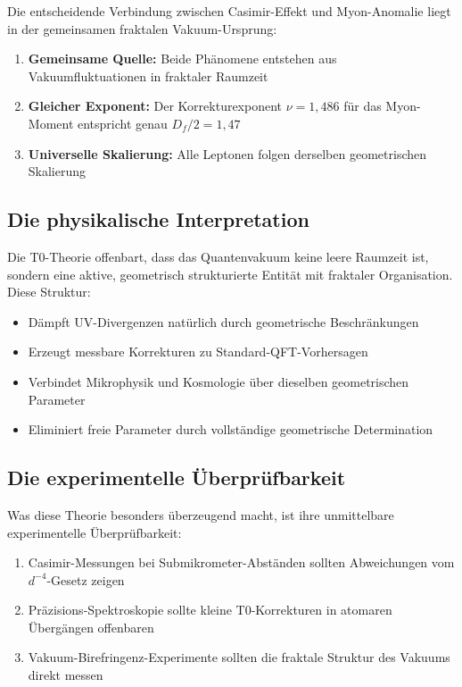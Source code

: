 \documentclass[12pt,a4paper]{article}
\begin{document}
		Die entscheidende Verbindung zwischen Casimir-Effekt und Myon-Anomalie liegt in der gemeinsamen fraktalen Vakuum-Ursprung:
		\begin{enumerate}
			\item \textbf{Gemeinsame Quelle:} Beide Ph\"anomene entstehen aus Vakuumfluktuationen in fraktaler Raumzeit
			\item \textbf{Gleicher Exponent:} Der Korrekturexponent $\nu = 1{,}486$ f\"ur das Myon-Moment entspricht genau $D_f/2 = 1{,}47$
			\item \textbf{Universelle Skalierung:} Alle Leptonen folgen derselben geometrischen Skalierung
		\end{enumerate}
		
		\subsection{Die physikalische Interpretation}
		
		Die T0-Theorie offenbart, dass das Quantenvakuum keine leere Raumzeit ist, sondern eine aktive, geometrisch strukturierte Entit\"at mit fraktaler Organisation. Diese Struktur:
		\begin{itemize}
			\item D\"ampft UV-Divergenzen nat\"urlich durch geometrische Beschr\"ankungen
			\item Erzeugt messbare Korrekturen zu Standard-QFT-Vorhersagen
			\item Verbindet Mikrophysik und Kosmologie \"uber dieselben geometrischen Parameter
			\item Eliminiert freie Parameter durch vollst\"andige geometrische Determination
		\end{itemize}
		
		\subsection{Die experimentelle \"Uberpr\"ufbarkeit}
		
		Was diese Theorie besonders \"uberzeugend macht, ist ihre unmittelbare experimentelle \"Uberpr\"ufbarkeit:
		\begin{enumerate}
			\item Casimir-Messungen bei Submikrometer-Abst\"anden sollten Abweichungen vom $d^{-4}$-Gesetz zeigen
			\item Pr\"azisions-Spektroskopie sollte kleine T0-Korrekturen in atomaren \"Uberg\"angen offenbaren
			\item Vakuum-Birefringenz-Experimente sollten die fraktale Struktur des Vakuums direkt messen
		\end{enumerate}
		
\end{document}
